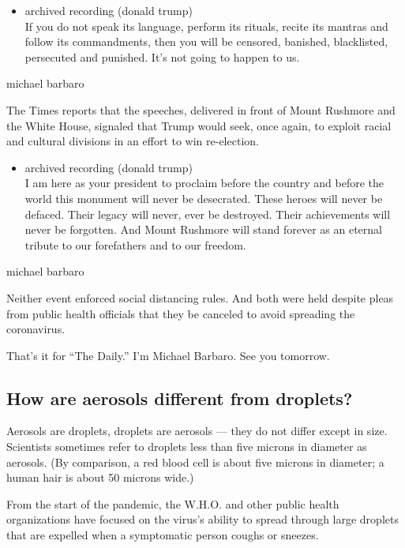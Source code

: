 \begin{itemize}
\tightlist
\item
  archived recording (donald trump)\\
  If you do not speak its language, perform its rituals, recite its
  mantras and follow its commandments, then you will be censored,
  banished, blacklisted, persecuted and punished. It's not going to
  happen to us.
\end{itemize}

michael barbaro

The Times reports that the speeches, delivered in front of Mount
Rushmore and the White House, signaled that Trump would seek, once
again, to exploit racial and cultural divisions in an effort to win
re-election.

\begin{itemize}
\tightlist
\item
  archived recording (donald trump)\\
  I am here as your president to proclaim before the country and before
  the world this monument will never be desecrated. These heroes will
  never be defaced. Their legacy will never, ever be destroyed. Their
  achievements will never be forgotten. And Mount Rushmore will stand
  forever as an eternal tribute to our forefathers and to our freedom.
\end{itemize}

michael barbaro

Neither event enforced social distancing rules. And both were held
despite pleas from public health officials that they be canceled to
avoid spreading the coronavirus.

That's it for ``The Daily.'' I'm Michael Barbaro. See you tomorrow.

\hypertarget{how-are-aerosols-different-from-droplets}{%
\subsection{How are aerosols different from
droplets?}\label{how-are-aerosols-different-from-droplets}}

Aerosols are droplets, droplets are aerosols --- they do not differ
except in size. Scientists sometimes refer to droplets less than five
microns in diameter as aerosols. (By comparison, a red blood cell is
about five microns in diameter; a human hair is about 50 microns wide.)

From the start of the pandemic, the W.H.O. and other public health
organizations have focused on the virus's ability to spread through
large droplets that are expelled when a symptomatic person coughs or
sneezes.

